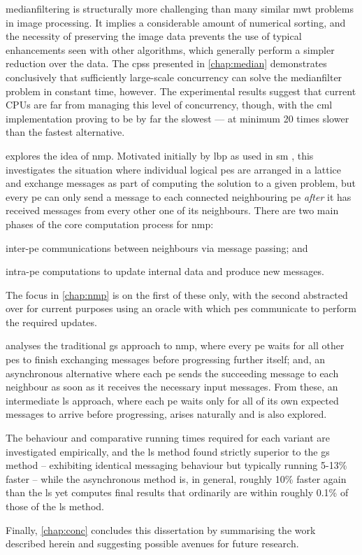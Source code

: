 \Gls{medianfilter}ing is structurally more challenging than many similar \gls{mwt} problems in image processing.  It implies a considerable amount of numerical sorting, and the necessity of preserving the image data prevents the use of typical enhancements seen with other algorithms, which generally perform a simpler reduction over the data.  The \glspl{cps} presented in \cref{chap:median} demonstrates conclusively that sufficiently large-scale concurrency can solve the \gls{medianfilter} problem in constant time, however.  The experimental results suggest that current CPUs are far from managing this level of concurrency, though, with the \gls{cml} implementation proving to be by far the slowest --- at minimum 20 times slower than the fastest alternative.

 explores the idea of \gls{nmp}.  Motivated initially by \gls{lbp} \cite{Sun2003,Felzenszwalb2006,Felzenszwalb2011} as used in \gls{sm} \cite{Sinha2020,Tippetts2016,Scharstein2002}, this  investigates the situation where individual logical \glspl{pe} are arranged in a lattice and exchange messages as part of computing the solution to a given problem, but every \gls{pe} can only send a message to each connected neighbouring \gls{pe} \emph{after} it has received messages from every other one of its neighbours.  There are two main phases of the core computation process for \gls{nmp}:
\begin{inparaenum}[a)]
\item inter-\gls{pe} communications between neighbours via message passing; and
\item intra-\gls{pe} computations to update internal data and produce new messages.
\end{inparaenum}  The focus in \cref{chap:nmp} is on the first of these only, with the second abstracted over for current purposes using an oracle with which \glspl{pe} communicate to perform the required updates.

 analyses the traditional \gls{gs} approach to \gls{nmp}, where every \gls{pe} waits for all other \glspl{pe} to finish exchanging messages before progressing further itself; and, an asynchronous alternative where each \gls{pe} sends the succeeding message to each neighbour as soon as it receives the necessary input messages.  From these, an intermediate \gls{ls} approach, where each \gls{pe} waits only for all of its own expected messages to arrive before progressing, arises naturally and is also explored.

The behaviour and comparative running times required for each variant are investigated empirically, and the \gls{ls} method found strictly superior to the \gls{gs} method -- exhibiting identical messaging behaviour but typically running 5-13\% faster -- while the asynchronous method is, in general, roughly 10\% faster again than the \gls{ls} yet computes final results that ordinarily are within roughly 0.1\% of those of the \gls{ls} method.

Finally, \cref{chap:conc} concludes this dissertation by summarising the work described herein and suggesting possible avenues for future research.